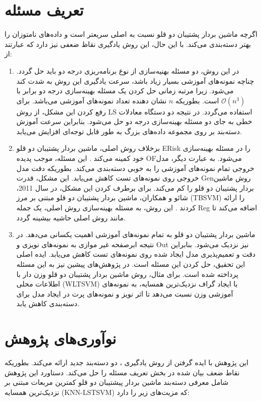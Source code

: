 \section{تعریف مسئله} \label{sec:1:2}
اگرچه ماشین بردار پشتیبان دو قلو نسبت به  اصلی سریعتر است و داده‌های نامتوزان را بهتر دسته‌بندی می‌کند. با این حال، این روش یادگیری نقاظ ضعفی نیز دارد که عبارتند از:
\begin{enumerate}
	\item 	در این روش، دو مسئله بهنیه‌سازی از نوع برنامه‌ریزی درجه دو باید حل گردد. چناچه نمونه‌های آموزشی بسیار زیاد باشد، سرعت یادگیری این روش به شدت کند می‌شود. زیرا مرتبه زمانی حل کردن یک مسئله بهینه‌سازی درجه دو برابر با $\mathcal{O}(n^3)$ است. بطوریکه $n$ نشان دهنده تعداد نمونه‌های آموزشی می‌باشد. برای رفع کردن این مشکل، از روش \gls{LS}  \cite{kumar2009} استفاده می‌گردد. در نتیجه دو دستگاه معادلات خطی به جای دو مسئله بهینه‌سازی درجه دو حل می‌شود. بنابراین سرعت آموزش دسته‌بند بر روی مجموعه داده‌های بزرگ به طور قابل توجه‌ای افزایش می‌یابد.
	\item برخلاف روش  اصلی، ماشین بردار پشتیبان دو قلو \gls{ERisk} را در مسئله بهینه‌سازی خود کمینه می‌کند .\cite{shao2011} این مسئله، موجب پدیده  \gls{OF}می‌شود. به عبارت دیگر، مدل خروجی تمام نمونه‌های آموزشی را به خوبی دسته‌بندی می‌کند. بطوریکه دقت مدل خروجی روی نمونه‌های تست کاهش می‌یابد. این مشکل، قدرت  \gls{Gen}روش ماشین بردار پشتیبان دو قلو را کم می‌کند. برای برطرف کردن این مشکل، در سال 2011، شائو و همکاران، ماشین بردار پشتیبان دو قلو مبتنی بر مرز  (\gls{TBSVM}) را ارائه کردند \cite{shao2011}. این روش، به مسئله بهینه‌سازی روش  اصلی، یک جمله  \gls{Reg} اضافه می‌کند تا مانند روش  اصلی حاشیه بیشینه گردد.
	\item ماشین بردار پشتیبان دو قلو به تمام نمونه‌های آموزشی اهمیت یکسانی می‌دهد. در نتیجه ابرصفحه غیر موازی به نمونه‌های نویزی و \gls{Out} نیز نزدیک می‌شود. بنابراین دقت و تعمیم‌پذیری مدل ایجاد شده روی نمونه‌های تست کاهش می‌یابد. ایده اصلی این تحقیق، حل کردن این مسئله است. در پژوهش‌های پیشین نیز به این مسئله پرداخته شده است. برای مثال، روش ماشین بردار پشتیبان دو قلو وزن دار با اطلاعات محلی (\gls{WLTSVM}) \cite{ye2012} با ایجاد گراف نزدیک‌ترین همسایه، به نمونه‌های آموزشی وزن نسبت می‌دهد تا اثر نویز و نمونه‌های پرت در ایجاد مدل برای دسته‌بندی کاهش یابد.
\end{enumerate}

\section{نوآوری‌های پژوهش} \label{sec:1:3}
این پژوهش با ایده گرفتن از روش یادگیری   \cite{ye2012}، دو دسته‌بند جدید ارائه می‌کند. بطوریکه نقاط ضعف بیان شده در بخش تعریف مسئله را حل می‌کند. دستاورد این پژوهش شامل معرفی دسته‌بند ماشین بردار پیشتیبان دو قلو کمترین مربعات مبتنی بر نزدیک‌ترین همسایه \cite{mir2018} (\gls{KNN-LSTSVM}) که مزیت‌های زیر را دارد:


